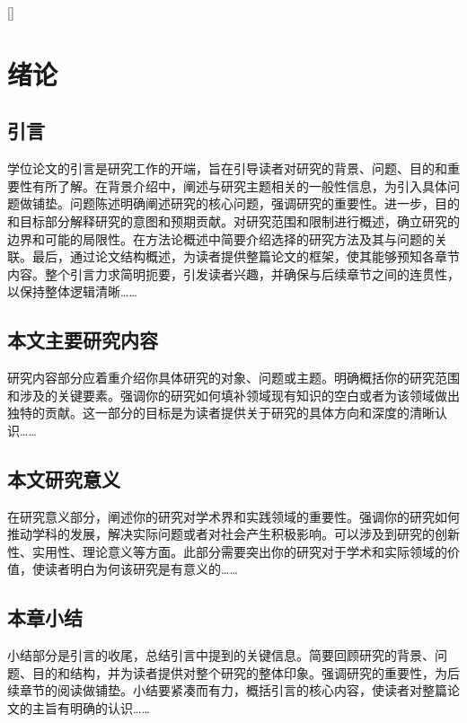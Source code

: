 



\newpage
{}


[]
\section{绪论}
\subsection{引言}
学位论文的引言是研究工作的开端，旨在引导读者对研究的背景、问题、目的和重要性有所了解。在背景介绍中，阐述与研究主题相关的一般性信息，为引入具体问题做铺垫。问题陈述明确阐述研究的核心问题，强调研究的重要性。进一步，目的和目标部分解释研究的意图和预期贡献。对研究范围和限制进行概述，确立研究的边界和可能的局限性。在方法论概述中简要介绍选择的研究方法及其与问题的关联。最后，通过论文结构概述，为读者提供整篇论文的框架，使其能够预知各章节内容。整个引言力求简明扼要，引发读者兴趣，并确保与后续章节之间的连贯性，以保持整体逻辑清晰……

\subsection{本文主要研究内容}
研究内容部分应着重介绍你具体研究的对象、问题或主题。明确概括你的研究范围和涉及的关键要素。强调你的研究如何填补领域现有知识的空白或者为该领域做出独特的贡献。这一部分的目标是为读者提供关于研究的具体方向和深度的清晰认识……

\subsection{本文研究意义}
在研究意义部分，阐述你的研究对学术界和实践领域的重要性。强调你的研究如何推动学科的发展，解决实际问题或者对社会产生积极影响。可以涉及到研究的创新性、实用性、理论意义等方面。此部分需要突出你的研究对于学术和实际领域的价值，使读者明白为何该研究是有意义的……

\subsection{本章小结}
小结部分是引言的收尾，总结引言中提到的关键信息。简要回顾研究的背景、问题、目的和结构，并为读者提供对整个研究的整体印象。强调研究的重要性，为后续章节的阅读做铺垫。小结要紧凑而有力，概括引言的核心内容，使读者对整篇论文的主旨有明确的认识……


